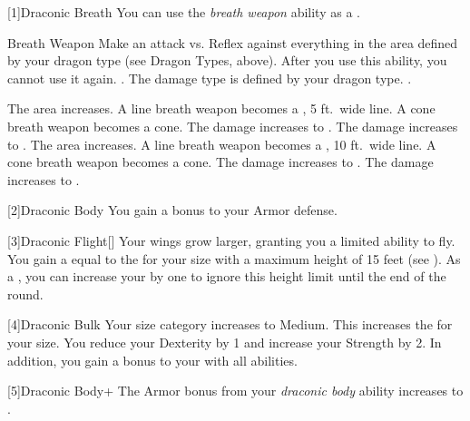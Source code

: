             [1]{Draconic Breath} You can use the \textit{breath weapon} ability as a .
            \begin{activeability}{Breath Weapon}
                \rankline
                Make an attack vs. Reflex against everything in the area defined by your dragon type (see Dragon Types, above).
                After you use this ability, you  cannot use it again.
                \hit \damageranktwo{}.
                The damage type is defined by your dragon type.
                \miss {}.

                \rankline
                 The area increases.
                    A line breath weapon becomes a \arealarge, 5 ft.\ wide line.
                    A cone breath weapon becomes a \areamed cone.
                 The damage increases to \damagerankthree{}.
                 The damage increases to \damagerankfour{}.
                 The area increases.
                    A line breath weapon becomes a \areahuge, 10 ft.\ wide line.
                    A cone breath weapon becomes a \arealarge cone.
                 The damage increases to \damageranksix{}.
                 The damage increases to \damagerankseven{}.
            \end{activeability}

            [2]{Draconic Body} You gain a  bonus to your Armor defense.

            [3]{Draconic Flight}[\sparkle] Your wings grow larger, granting you a limited ability to fly.
            You gain a  equal to the  for your size with a maximum height of 15 feet (see ).
            As a , you can increase your  by one to ignore this height limit until the end of the round.

            [4]{Draconic Bulk} Your size category increases to Medium.
            This increases the  for your size.
            You reduce your Dexterity by 1 and increase your Strength by 2.
            In addition, you gain a  bonus to your  with all abilities.

            [5]{Draconic Body+} The Armor bonus from your \textit{draconic body} ability increases to .

